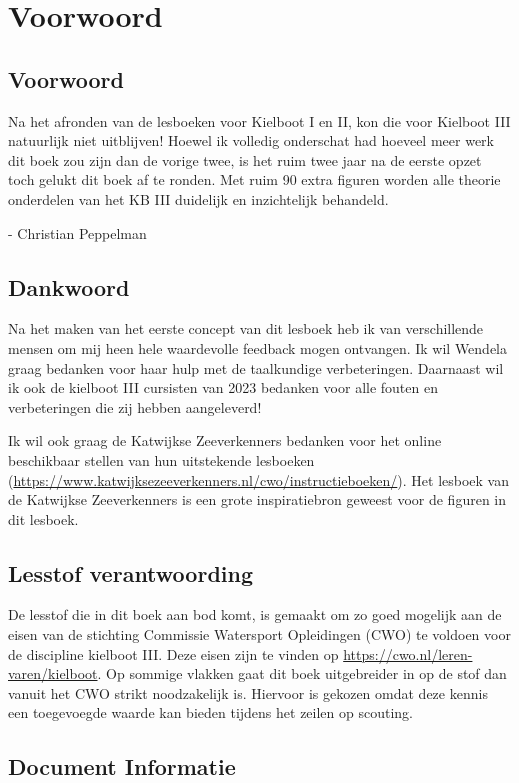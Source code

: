 \chapter*{Voorwoord}

\section{Voorwoord}
Na het afronden van de lesboeken voor Kielboot I en II, kon die voor Kielboot III natuurlijk niet uitblijven! Hoewel ik volledig onderschat had hoeveel meer werk dit boek zou zijn dan de vorige twee, is het ruim twee jaar na de eerste opzet toch gelukt dit boek af te ronden. Met ruim 90 extra figuren worden alle theorie onderdelen van het KB III duidelijk en inzichtelijk behandeld.

- Christian Peppelman
\section{Dankwoord}
Na het maken van het eerste concept van dit lesboek heb ik van verschillende mensen om mij heen hele waardevolle feedback mogen ontvangen. Ik wil Wendela graag bedanken voor haar hulp met de taalkundige verbeteringen. Daarnaast wil ik ook de kielboot III cursisten van 2023 bedanken voor alle fouten en verbeteringen die zij hebben aangeleverd!

Ik wil ook graag de Katwijkse Zeeverkenners bedanken voor het online beschikbaar stellen van hun uitstekende lesboeken (\url{https://www.katwijksezeeverkenners.nl/cwo/instructieboeken/}). Het lesboek van de Katwijkse Zeeverkenners is een grote inspiratiebron geweest voor de figuren in dit lesboek.


\section{Lesstof verantwoording}
De lesstof die in dit boek aan bod komt, is gemaakt om zo goed mogelijk aan de eisen van de stichting Commissie Watersport Opleidingen (CWO) te voldoen voor de discipline kielboot III. Deze eisen zijn te vinden op \url{https://cwo.nl/leren-varen/kielboot}. Op sommige vlakken gaat dit boek uitgebreider in op de stof dan vanuit het CWO strikt noodzakelijk is. Hiervoor is gekozen omdat deze kennis een toegevoegde waarde kan bieden tijdens het zeilen op scouting.

\vfil\newpage

\section{Document Informatie}
